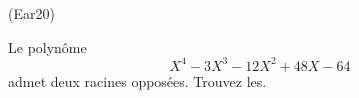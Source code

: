 \begin{tiny}(Ear20)\end{tiny} Le polynôme
\begin{displaymath}
 X^4 -3X^3-12X^2+48X-64
\end{displaymath}
admet deux racines opposées. Trouvez les.
 